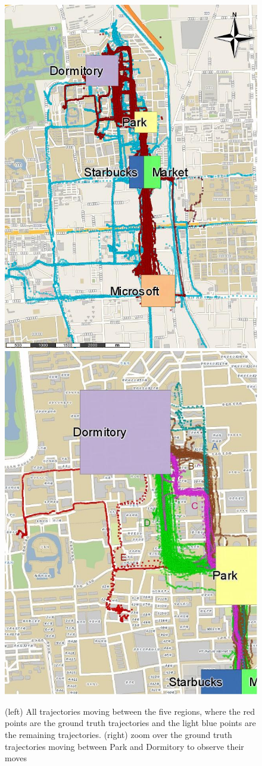 \begin{figure}[ht!]
\centering
\centerline{
\includegraphics[width=.5\textwidth]{Images/new_Geolife-Trajectories-painted.jpg}
\includegraphics[width=.5\textwidth]{Images/Geolife-Paths-painted.jpg}
}
\caption{(left) All trajectories moving between the five regions, where the red points are the ground truth trajectories and the light blue points are the remaining trajectories. (right) zoom over the ground truth trajectories moving between Park and Dormitory to observe their moves}
\label{fig:geolife_map_rois}
\end{figure}


